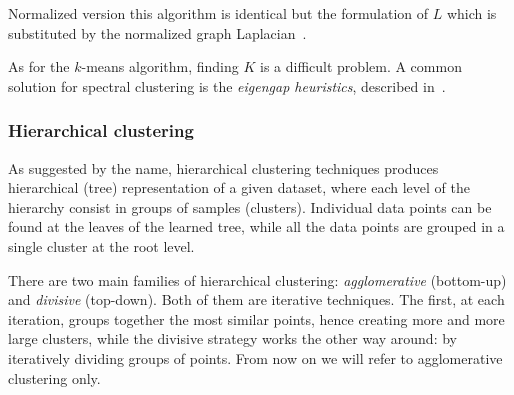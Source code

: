 	Normalized version this algorithm is identical but the formulation of $L$ which is substituted by the normalized graph Laplacian~\cite{von2007tutorial}.
	
	As for the $k$-means algorithm, finding $K$ is a difficult problem. A common solution for spectral clustering is the \textit{eigengap heuristics}, described in~\cite{von2007tutorial}.
    
    \subsubsection{Hierarchical clustering} \label{sec:hierarchical_clustering}
	As suggested by the name, hierarchical clustering techniques produces hierarchical (tree) representation of a given dataset, where each level of the hierarchy consist in groups of samples (clusters). Individual data points can be found at the leaves of the learned tree, while all the data points are grouped in a single cluster at the root level.
	
	There are two main families of hierarchical clustering: \textit{agglomerative} (bottom-up) and \textit{divisive} (top-down).
	Both of them are iterative techniques. The first, at each iteration, groups together the most similar points, hence creating more and more large clusters, while the divisive strategy works the other way around: by iteratively dividing groups of points. From now on we will refer to agglomerative clustering only.
	
